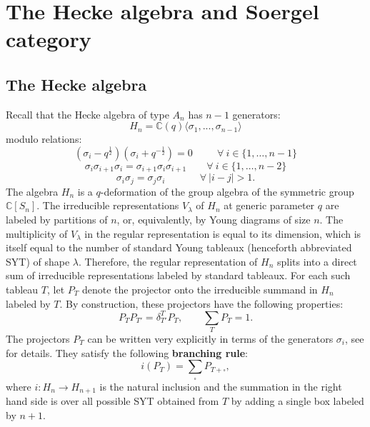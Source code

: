 \documentclass[12pt]{amsart}
\numberwithin{equation}{section}
\theoremstyle{definition}
\theoremstyle{remark}
\newcommand{\CC}{\mathbb{C}}
\renewcommand{\1}{\mathbf{1}}
\newcommand{\sq}{\square}
\begin{document}
\section{The Hecke algebra and Soergel category}
\label{sec:Sbim}

\subsection{The Hecke algebra}

Recall that the Hecke algebra of type $A_n$ has $n-1$ generators:
$$
H_n = \CC(q) \langle \sigma_1,...,\sigma_{n-1} \rangle
$$
modulo relations:
\begin{equation}
\label{eqn:hecke1}
\left(\sigma_i-q^{\frac 12} \right)\left(\sigma_i+q^{-\frac 12} \right) = 0 \ \qquad \ \forall \ i\in \{1,\ldots,n-1\}
\end{equation}
\begin{equation}
\label{eqn:hecke2}
\sigma_i\sigma_{i+1}\sigma_i = \sigma_{i+1}\sigma_i\sigma_{i+1} \qquad \forall \ i\in \{1,\ldots,n-2\}
\end{equation}
\begin{equation}
\label{eqn:hecke3}
\sigma_i\sigma_j = \sigma_j\sigma_i \qquad \quad \ \ \forall \ |i-j|>1.
\end{equation}
The algebra $H_n$ is a $q$-deformation of the group algebra of the symmetric group $\CC[S_n]$.
The irreducible representations $V_{\lambda}$ of $H_n$ at generic parameter $q$ are labeled by partitions of $n$, or, equivalently, by Young diagrams of size $n$. The multiplicity of $V_{\lambda}$ in the regular representation is equal to its dimension, which is itself equal to the number of standard Young tableaux (henceforth abbreviated SYT) of shape $\lambda$. Therefore, the regular representation of $H_n$ splits into a direct sum of irreducible representations labeled by standard tableaux. For each such tableau $T$, let $P_T$ denote the projector onto the irreducible summand in $H_n$ labeled by $T$. By construction, these projectors have the following properties:
\begin{equation}
\label{proj}
P_T P_{T'} = \delta_{T'}^T P_T, \qquad \sum_{T}P_{T}=1.
\end{equation}
The projectors $P_T$ can be written very explicitly in terms of the generators $\sigma_i$, see \cite{AiMor,gyoja} for details. They satisfy the following \textbf{branching rule}:
\begin{equation}
\label{branching}
i(P_T)=\sum_{\sq}P_{T+\sq},
\end{equation}
where $i:H_n\to H_{n+1}$ is the natural inclusion and the summation in the right hand side is over all 
possible SYT obtained from $T$ by adding a single box labeled by $n+1$.
\end{document}
